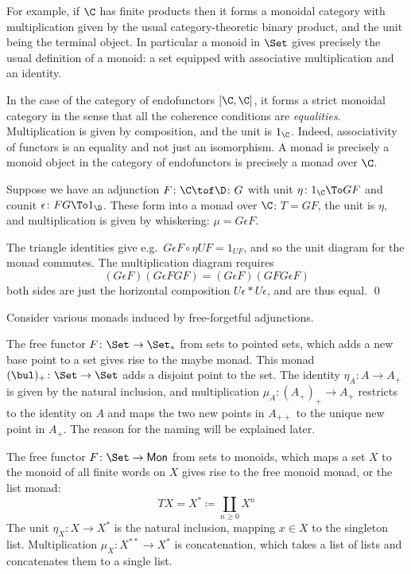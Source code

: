 For example, if $\C$ has finite products then it forms a monoidal category with multiplication given by the usual category-theoretic binary product, and the unit being
the terminal object.
In particular a monoid in $\Set$ gives precisely the usual definition of a monoid: a set equipped with associative multiplication and an identity.

In the case of the category of endofunctors $[\C,\C]$, it forms a {\emphcolor strict monoidal category} in the sense that all the coherence conditions are {\it equalities}.
Multiplication is given by composition, and the unit is $1_\C$.
Indeed, associativity of functors is an equality and not just an isomorphism.
A monad is precisely a monoid object in the category of endofunctors is precisely a monad over $\C$.

\blemm

    Suppose we have an adjunction $F\colon\C\tof\D\colon G$ with unit $\eta\colon1_\C\To GF$ and counit $\epsilon\colon FG\To1_\D$.
    These form into a monad over $\C$: $T=GF$, the unit is $\eta$, and multiplication is given by whiskering: $\mu=G\epsilon F$.

\elemm

\bproof

    The triangle identities give e.g.\ $G\epsilon F\circ\eta UF=1_{UF}$, and so the unit diagram for the monad commutes.
    The multiplication diagram requires
    $$ (G\epsilon F)(G\epsilon FGF) = (G\epsilon F)(GFG\epsilon F) $$
    both sides are just the horizontal composition $U\epsilon*U\epsilon$, and are thus equal.
    \qed

\eproof

\bexam

    Consider various monads induced by free-forgetful adjunctions.
    \benum
        \item The free functor $F\colon\Set\to\Set_*$ from sets to pointed sets, which adds a new base point to a set gives rise to the {\emphcolor maybe monad}.
        This monad $(\bul)_+\colon\Set\to\Set$ adds a disjoint point to the set.
        The identity $\eta_A\colon A\to A_+$ is given by the natural inclusion, and multiplication $\mu_A\colon(A_+)_+\to A_+$ restricts to the identity on $A$ and maps
        the two new points in $A_{++}$ to the unique new point in $A_+$.
        The reason for the naming will be explained later.

        \item The free functor $F\colon\Set\to{\sf Mon}$ from sets to monoids, which maps a set $X$ to the monoid of all finite words on $X$ gives rise to the
        {\emphcolor free monoid monad}, or the {\emphcolor list monad}:
        $$ TX = X^* \coloneqq \coprod_{n\geq0}X^n $$
        The unit $\eta_X\colon X\to X^*$ is the natural inclusion, mapping $x\in X$ to the singleton list.
        Multiplication $\mu_X\colon X^{**}\to X^*$ is concatenation, which takes a list of lists and concatenates them to a single list.
    \eenum

